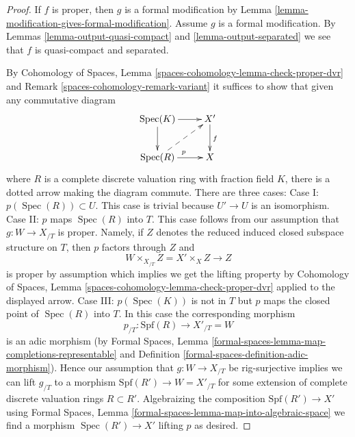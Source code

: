 \documentclass[10pt,a4paper]{amsart}
\theoremstyle{plain}
\theoremstyle{definition}
\theoremstyle{remark}
\numberwithin{equation}{subsection}
\def\Spec{\mathop{\mathrm{Spec}}}
\begin{document}
\begin{proof}
If $f$ is proper, then $g$ is a formal modification by
Lemma \ref{lemma-modification-gives-formal-modification}.
Assume $g$ is a formal modification. By
Lemmas \ref{lemma-output-quasi-compact} and \ref{lemma-output-separated}
we see that $f$ is quasi-compact and separated.

\medskip\noindent
By Cohomology of Spaces, Lemma \ref{spaces-cohomology-lemma-check-proper-dvr}
and Remark \ref{spaces-cohomology-remark-variant}
it suffices to show that given any commutative diagram
$$
\xymatrix{
\Spec(K) \ar[r] \ar[d] & X' \ar[d]^f \\
\Spec(R) \ar[r]^p \ar@{-->}[ru] & X
}
$$
where $R$ is a complete discrete valuation ring with fraction field $K$,
there is a dotted arrow making the diagram commute.
There are three cases:
Case I: $p(\Spec(R)) \subset U$. This case is trivial
because $U' \to U$ is an isomorphism.
Case II: $p$ maps $\Spec(R)$ into $T$. This case follows
from our assumption that $g : W \to X_{/T}$ is proper. Namely,
if $Z$ denotes the reduced induced closed subspace structure
on $T$, then $p$ factors through $Z$ and
$$
W \times_{X_{/T}} Z = X' \times_X Z \longrightarrow Z
$$
is proper by assumption which implies we get the lifting property by
Cohomology of Spaces, Lemma \ref{spaces-cohomology-lemma-check-proper-dvr}
applied to the displayed arrow. Case III: $p(\Spec(K))$ is not in $T$
but $p$ maps the closed point of $\Spec(R)$ into $T$. In this case
the corresponding morphism
$$
p_{/T} : \text{Spf}(R) \longrightarrow X'_{/T} = W
$$
is an adic morphism (by
Formal Spaces, Lemma
\ref{formal-spaces-lemma-map-completions-representable} and
Definition \ref{formal-spaces-definition-adic-morphism}).
Hence our assumption that $g : W \to X_{/T}$ be rig-surjective
implies we can lift $g_{/T}$ to a morphism
$\text{Spf}(R') \to W = X'_{/T}$
for some extension of complete discrete valuation rings $R \subset R'$.
Algebraizing the composition $\text{Spf}(R') \to X'$ using
Formal Spaces, Lemma \ref{formal-spaces-lemma-map-into-algebraic-space}
we find a morphism $\Spec(R') \to X'$ lifting $p$ as desired.
\end{proof}
\end{document}
